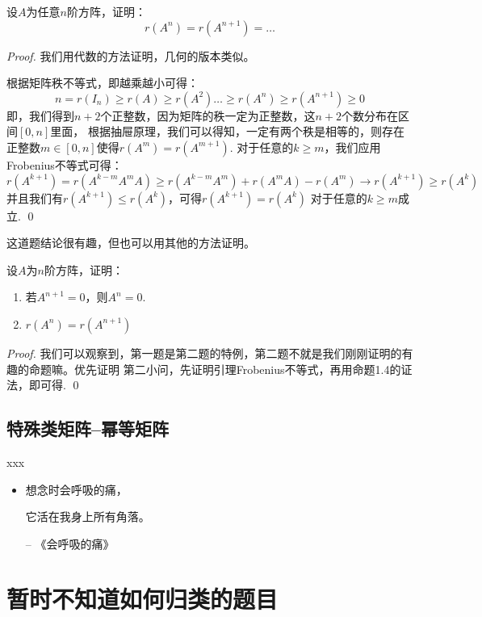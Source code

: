 \begin{proposition}
	设$A$为任意$n$阶方阵，证明：
	$$
		r(A^{n}) = r(A^{n+1}) = \dots
	$$
\end{proposition}

\begin{proof}
	我们用代数的方法证明，几何的版本类似。
	
	根据矩阵秩不等式，即越乘越小可得：
	$$
		n=r(I_n) \geq r(A) \geq r(A^2) \dots \geq r(A^{n}) \geq r(A^{n+1}) \geq 0
	$$
	即，我们得到$n+2$个正整数，因为矩阵的秩一定为正整数，这$n+2$个数分布在区间$[0,n]$里面，
	根据抽屉原理，我们可以得知，一定有两个秩是相等的，则存在正整数$m \in [0,n]$使得$r(A^m)=r(A^{m+1})$.
	对于任意的$k \geq m$，我们应用Frobenius不等式可得：
	$$
		r(A^{k+1}) = r(A^{k-m}A^m A) \geq r(A^{k-m}A^m) + r(A^m A) - r(A^m)
		\to r(A^{k+1}) \geq r(A^k) 
	$$
	并且我们有$r(A^{k+1}) \leq r(A^k)$，可得$r(A^{k+1}) = r(A^k)$ 对于任意的$k \geq m$成立.
	\qed
\end{proof}

这道题结论很有趣，但也可以用其他的方法证明。

\begin{ex}[SJTU 2022]
	设$A$为$n$阶方阵，证明：
	\begin{enumerate}
		\item 若$A^{n+1}=0$，则$A^n=0$.
		\item $r(A^n) = r(A^{n+1})$
	\end{enumerate}
\end{ex}

\begin{proof}
	我们可以观察到，第一题是第二题的特例，第二题不就是我们刚刚证明的有趣的命题嘛。优先证明
	第二小问，先证明引理Frobenius不等式，再用命题1.4的证法，即可得.
	\qed
\end{proof}

\section{特殊类矩阵\uppercase\expandafter{}--幂等矩阵}

xxx

\begin{itemize}
	\item 想念时会呼吸的痛，

	它活在我身上所有角落。                        
	
	-- 《会呼吸的痛》
\end{itemize}

\chapter{暂时不知道如何归类的题目}

